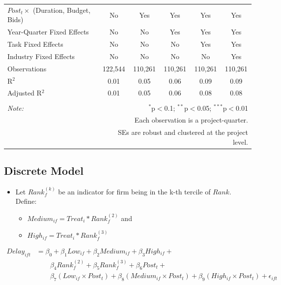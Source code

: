 \documentclass[
]{article}
\providecommand{\tightlist}{%
  \setlength{\itemsep}{0pt}\setlength{\parskip}{0pt}}
\begin{document}
\begin{table}[H]
\begin{tabular}{@{\extracolsep{-2pt}}lccccc}
$Post_t \times$  (Duration, Budget, Bids) & No & Yes & Yes & Yes & Yes \\ 
Year-Quarter Fixed Effects & No & No & Yes & Yes & Yes \\ 
Task Fixed Effects & No & No & No & Yes & Yes \\ 
Industry Fixed Effects & No & No & No & No & Yes \\ 
Observations & 122,544 & 110,261 & 110,261 & 110,261 & 110,261 \\ 
R$^{2}$ & 0.01 & 0.05 & 0.06 & 0.09 & 0.09 \\ 
Adjusted R$^{2}$ & 0.01 & 0.05 & 0.06 & 0.08 & 0.08 \\ 
\hline 
\hline \\[-1.8ex] 
\textit{Note:}  & \multicolumn{5}{r}{$^{*}$p$<$0.1; $^{**}$p$<$0.05; $^{***}$p$<$0.01} \\ 
 & \multicolumn{5}{r}{Each observation is a project-quarter.} \\ 
 & \multicolumn{5}{r}{SEs are robust and clustered at the project level.} \\ 
\end{tabular} 
\end{table}

\hypertarget{discrete-model}{%
\subsection{Discrete Model}\label{discrete-model}}

\begin{itemize}
\tightlist
\item
  Let \(Rank_f^{(k)}\) be an indicator for firm being in the k-th
  tercile of \(Rank\). Define:

  \begin{itemize}
  \tightlist
  \item
    \(Medium_{if}=Treat_i*Rank_f^{(2)}\) and
  \item
    \(High_{if} = Treat_i*Rank_f^{(3)}\)
  \end{itemize}
\end{itemize}

\[\begin{aligned} Delay_{ift} &= \beta_0+\beta_1 Low_{if}+\beta_2 Medium_{if}+\beta_3 High_{if} +\\  & \qquad  \beta_4 Rank_f^{(2)} + \beta_5 Rank_f^{(3)}+ \beta_6 Post_t + \\& \qquad \beta_7 (Low_{if} \times Post_t) + \beta_8 (Medium_{if} \times Post_t) + \beta_9 (High_{if} \times Post_t) + \epsilon_{ift} \end{aligned}\]
\end{document}
